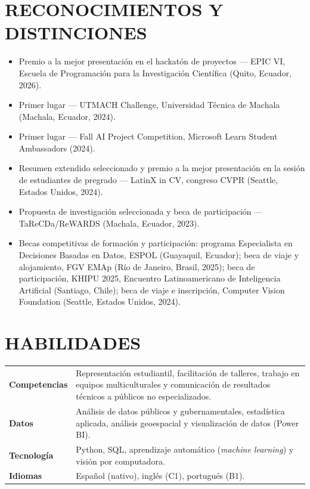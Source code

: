 \documentclass[letterpaper,10pt]{article}
\newenvironment{vinetas}
  {\begin{itemize}[leftmargin=1.4em,label=$\bullet$,itemsep=0.5pt,topsep=1pt,parsep=0pt,partopsep=0pt]}
  {\end{itemize}\vspace{1pt}}
\begin{document}
\section*{RECONOCIMIENTOS Y DISTINCIONES}

\begin{vinetas}
  \item Premio a la mejor presentación en el hackatón de proyectos --- EPIC
        VI, Escuela de Programación para la Investigación Científica (Quito,
        Ecuador, 2026).
  \item Primer lugar --- UTMACH Challenge, Universidad Técnica de Machala
        (Machala, Ecuador, 2024).
  \item Primer lugar --- Fall AI Project Competition, Microsoft Learn Student
        Ambassadors (2024).
  \item Resumen extendido seleccionado y premio a la mejor presentación en la
        sesión de estudiantes de pregrado --- LatinX in CV, congreso CVPR
        (Seattle, Estados Unidos, 2024).
  \item Propuesta de investigación seleccionada y beca de participación ---
        TaReCDa/ReWARDS (Machala, Ecuador, 2023).
  \item Becas competitivas de formación y participación: programa Especialista
        en Decisiones Basadas en Datos, ESPOL (Guayaquil, Ecuador); beca de
        viaje y alojamiento, FGV EMAp (Río de Janeiro, Brasil, 2025); beca de
        participación, KHIPU 2025, Encuentro Latinoamericano de Inteligencia
        Artificial (Santiago, Chile); beca de viaje e inscripción, Computer
        Vision Foundation (Seattle, Estados Unidos, 2024).
\end{vinetas}

\section*{HABILIDADES}

\begin{tabular*}{\textwidth}{@{}p{}@{}p{}@{}}
  \textbf{Competencias} & Representación estudiantil, facilitación de talleres,
                          trabajo en equipos multiculturales y comunicación de
                          resultados técnicos a públicos no especializados. \\[3pt]
  \textbf{Datos} & Análisis de datos públicos y gubernamentales, estadística
                   aplicada, análisis geoespacial y visualización de datos
                   (Power BI). \\[3pt]
  \textbf{Tecnología} & Python, SQL, aprendizaje automático (\textit{machine
                        learning}) y visión por computadora. \\[3pt]
  \textbf{Idiomas} & Español (nativo), inglés (C1), portugués (B1). \\
\end{tabular*}
\end{document}
